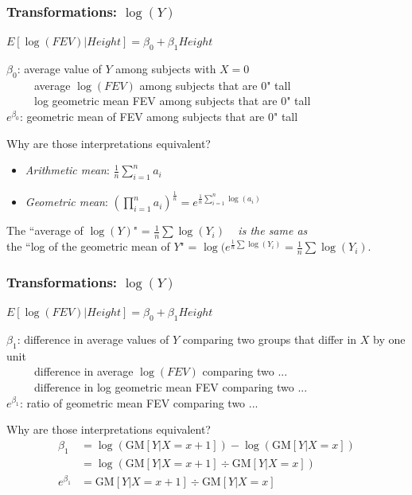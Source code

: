 \documentclass[12pt, 
hyperref={colorlinks=true, linkcolor=blue, urlcolor=cyan},dvipsnames]{beamer}
\begin{document}
\begin{frame}
\frametitle{Transformations: $\log(Y)$}
\begin{center} $E[\log(FEV)|Height] = \beta_0 + \beta_1 Height$ \end{center}
$\beta_0$: average value of $Y$ among subjects with $X = 0$\\ \pause
\ \ \ \ \ average $\log(FEV)$ among subjects that are 0" tall \\ \pause
\ \ \ \ \ log geometric mean FEV among subjects that are 0" tall \\ 
\color{blue} $e^{\beta_0}$: geometric mean of FEV among subjects that are 0" tall \color{black}\pause

Why are those interpretations equivalent?\vspace{-0.3cm}
\begin{itemize}
\item[] \textit{Arithmetic mean}: $\frac{1}{n} \sum_{i=1}^n a_i$
\item[] \textit{Geometric mean}: $\left(\prod_{i=1}^n a_i\right)^{\frac{1}{n}} = e^{\frac{1}{n} \sum_{i=1}^n \log(a_i)}$
\end{itemize}
\vspace{-0.3cm}
\begin{center} \begin{footnotesize}The \color{blue} ``average of $\log(Y)$" \color{black} = $\frac{1}{n}\sum \log(Y_i)$ \ \color{blue} \textit{is the same as} \color{black}\\the \color{blue}``log of the geometric mean of $Y$" \color{black}= $\log(e^{\frac{1}{n}\sum \log(Y_i)} = \frac{1}{n}\sum \log(Y_i)$.\end{footnotesize}\end{center}
\end{frame}

\begin{frame}
\frametitle{Transformations: $\log(Y)$}
\begin{center} $E[\log(FEV)|Height] = \beta_0 + \beta_1 Height$ \end{center}
$\beta_1$: difference in average values of $Y$ comparing two groups that differ in $X$ by one unit\\ \pause
\ \ \ \ \ difference in average $\log(FEV)$ comparing two ...\\ \pause
\ \ \ \ \ difference in log geometric mean FEV comparing two ... \\ 
\color{blue} $e^{\beta_1}$: ratio of geometric mean FEV comparing two ... \color{black} \pause

Why are those interpretations equivalent?\vspace{-0.3cm}
\begin{align*}
\beta_1 & = \log(\text{GM}[Y|X=x+1])-\log(\text{GM}[Y|X=x])\\
& = \log\left(\text{GM}[Y|X=x+1]\div\text{GM}[Y|X=x]\right)\\
e^{\beta_1} & = \text{GM}[Y|X=x+1]\div\text{GM}[Y|X=x]
\end{align*}
\end{frame}
\end{document}
